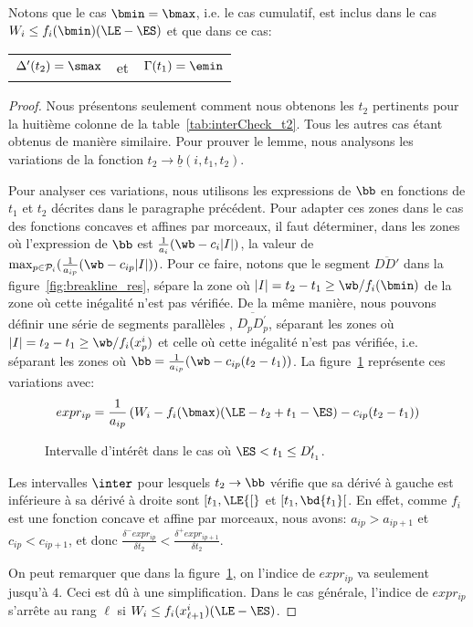 Notons que le cas $\bmin=\bmax$, i.e. le cas cumulatif, est inclus
dans le cas $W_i \le f_i(\bmin)(\LE - \ES )$ et que dans ce cas: 
\begin{center}
\begin{tabular}{lcr}
$\Delta'(t_2)=\smax$ & et &
$\Gamma(t_1)=\emin$
\end{tabular}
\end{center}
 \begin{proof}
Nous présentons seulement comment nous obtenons les $t_2$ pertinents
pour la huitième colonne de la table~\ref{tab:interCheck_t2}. Tous les
autres cas étant obtenus de manière similaire. 
Pour prouver le lemme, nous analysons les variations de la fonction
   $t_2 \rightarrow \underline{b}(i,t_1,t_2)$. 

Pour analyser ces variations, nous utilisons les expressions de $\bb$
en fonctions de $t_1$ et $t_2$ décrites dans le paragraphe
précédent. Pour adapter ces zones dans le cas des fonctions concaves
et affines par morceaux, il faut déterminer, dans les zones où
l'expression de $\bb$ est $\frac{1}{a_i}(\wb - c_i|I|)$, la valeur de
$\max_{p \in \P_i}(\frac{1}{a_{ip}}(\wb - c_{ip}|I|))$. Pour ce faire,
notons que le segment $\overline{DD'}$ dans la
figure~\ref{fig:breakline_res}, sépare la zone où $|I|= t_2 - t_1 \ge
\wb/ f_i(\bmin)$ de la zone où cette inégalité n'est pas vérifiée. De
la même manière, nous pouvons définir une série de segments parallèles
, $\overline{D_{p}D_{p}^{'}}$, séparant les zones où $|I|= t_2 - t_1
\ge \wb/f_i(x_p^i)$ et celle où cette inégalité n'est pas vérifiée,
i.e. séparant les zones où $\bb= \frac{1}{a_{ip}}(\wb -
c_{ip}(t_2-t_1))$. La figure~\ref{fig:variation} représente ces
variations avec: \[expr_{ip}=\frac{1}{a_{ip}}\left(W_i- f_i(\bmax)(\LE
-t_2+t_1-\ES) - c_{ip}(t_2-t_1)\right)\]

   \begin{figure}[!htb]
     
     \caption{Intervalle d'intérêt dans le cas où $\ES <t_1 \le D'_{t_1}$.}
     \label{fig:variation}
   \end{figure}


Les intervalles $\inter$ pour lesquels $t_2 \rightarrow \bb$ vérifie
que sa dérivé à 
gauche est inférieure à sa dérivé à droite sont 
${[}t_1,\LE{[}$ et $[t_1,\bd{t_1}[$. En effet, comme $f_i$ est une
fonction concave et affine par morceaux, nous avons: $a_{ip} >
a_{ip+1}$ et $c_{ip} <c_{ip+1}$, et donc
$\frac{\delta^{-}expr_{ip}}{\delta t_2}<
\frac{\delta^{+}expr_{ip+1}}{\delta t_2}$.

On peut remarquer que dans la figure~\ref{fig:variation}, on l'indice
de $expr_{ip}$ va seulement jusqu'à $4$. Ceci est dû à une
simplification. Dans le cas générale, l'indice de $expr_{ip}$ s'arrête
au rang $\ell$ si $W_i \le f_i(x^i_{\ell +1})(\LE - \ES)$.
\end{proof}

